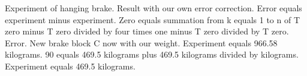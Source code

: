 Experiment of hanging brake. Result with our own error correction. Error equals experiment minus experiment. Zero equals summation from k equals 1 to n of T zero minus T zero divided by four times one minus T zero divided by T zero. Error. New brake block C now with our weight. Experiment equals 966.58 kilograms. 90 equals 469.5 kilograms plus 469.5 kilograms divided by kilograms. Experiment equals 469.5 kilograms.